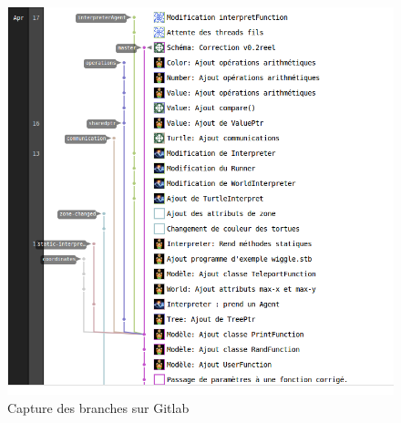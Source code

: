 \begin{figure}[h]
\centering
\caption{\label{branche} Capture des branches sur Gitlab}
\includegraphics[scale=0.35]{doc/report/uml/network-v3.png}
\end{figure}
